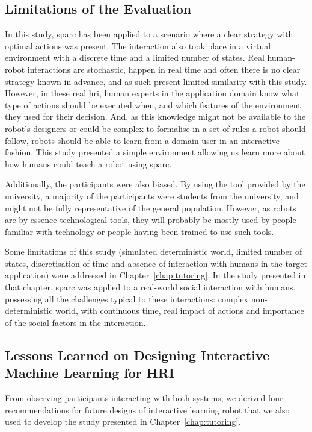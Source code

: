 \subsection{Limitations of the Evaluation}

In this study, \gls{sparc} has been applied to a scenario where a clear strategy with optimal actions was present. The interaction also took place in a virtual environment with a discrete time and a limited number of states. Real human-robot interactions are stochastic, happen in real time and often there is no clear strategy known in advance, and as such present limited similarity with this study. However, in these real \gls{hri}, human experts in the application domain know what type of actions should be executed when, and which features of the environment they used for their decision. And, as this knowledge might not be available to the robot's designers or could be complex to formalise in a set of rules a robot should follow, robots should be able to learn from a domain user in an interactive fashion. This study presented a simple environment allowing us learn more about how humans could teach a robot using \gls{sparc}.

Additionally, the participants were also biased. By using the tool provided by the university, a majority of the participants were students from the university, and might not be fully representative of the general population. However, as robots are by essence technological tools, they will probably be mostly used by people familiar with technology or people having been trained to use such tools. 

Some limitations of this study (simulated deterministic world, limited number of states, discretisation of time and absence of interaction with humans in the target application) were addressed in Chapter~\ref{chap:tutoring}. In the study presented in that chapter, \gls{sparc} was applied to a real-world social interaction with humans, possessing all the challenges typical to these interactions: complex non-deterministic world, with continuous time, real impact of actions and importance of the social factors in the interaction.

\subsection{Lessons Learned on Designing Interactive Machine Learning for HRI}

From observing participants interacting with both systems, we derived four recommendations for future designs of interactive learning robot that we also used to develop the study presented in Chapter~\ref{chap:tutoring}. 

